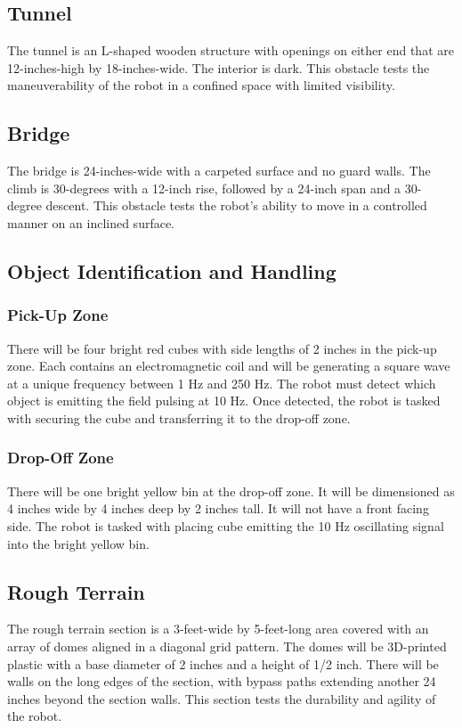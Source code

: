 \subsection{Tunnel}
The tunnel is an L-shaped wooden structure with openings on either end that are 12-inches-high by 18-inches-wide. The interior is dark. This obstacle tests the maneuverability of the robot in a confined space with limited visibility.

\subsection{Bridge}
The bridge is 24-inches-wide with a carpeted surface and no guard walls. The climb is 30-degrees with a 12-inch rise, followed by a 24-inch span and a 30-degree descent. This obstacle tests the robot’s ability to move in a controlled manner on an inclined surface.

\subsection{Object Identification and Handling}
	\subsubsection{Pick-Up Zone}
		There will be four bright red cubes with side lengths of 2 inches in the pick-up zone. Each contains an electromagnetic coil and will be generating a square wave at a unique frequency between 1 Hz and 250 Hz. The robot must detect which object is emitting the field pulsing at 10 Hz. Once detected, the robot is tasked with securing the cube and transferring it to the drop-off zone.
	\subsubsection{Drop-Off Zone}
		There will be one bright yellow bin at the drop-off zone. It will be dimensioned as 4 inches wide by 4 inches deep by 2 inches tall. It will not have a front facing side. The robot is tasked with placing  cube emitting the 10 Hz oscillating signal into the bright yellow bin.

\subsection{Rough Terrain}
The rough terrain section is a 3-feet-wide by 5-feet-long area covered with an array of domes aligned in a diagonal grid pattern. The domes will be 3D-printed plastic with a base diameter of 2 inches and a height of 1/2 inch. There will be walls on the long edges of the section, with bypass paths extending another 24 inches beyond the section walls. This section tests the durability and agility of the robot.

